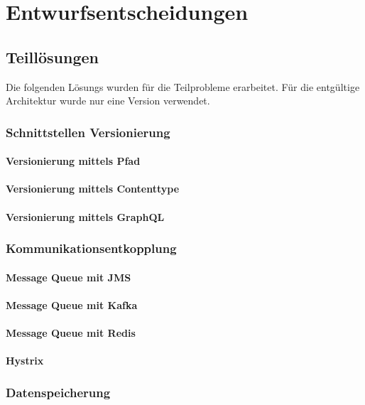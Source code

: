 \chapter{Entwurfsentscheidungen}

\section{Teillösungen}

Die folgenden Lösungs wurden für die Teilprobleme erarbeitet. Für die entgültige Architektur wurde nur eine Version verwendet.

\subsection{Schnittstellen Versionierung}

\subsubsection{Versionierung mittels Pfad}
\subsubsection{Versionierung mittels Contenttype}
\subsubsection{Versionierung mittels GraphQL}

\subsection{Kommunikationsentkopplung}

\subsubsection{Message Queue mit JMS}
\subsubsection{Message Queue mit Kafka}
\subsubsection{Message Queue mit Redis}
\subsubsection{Hystrix}

\subsection{Datenspeicherung}

